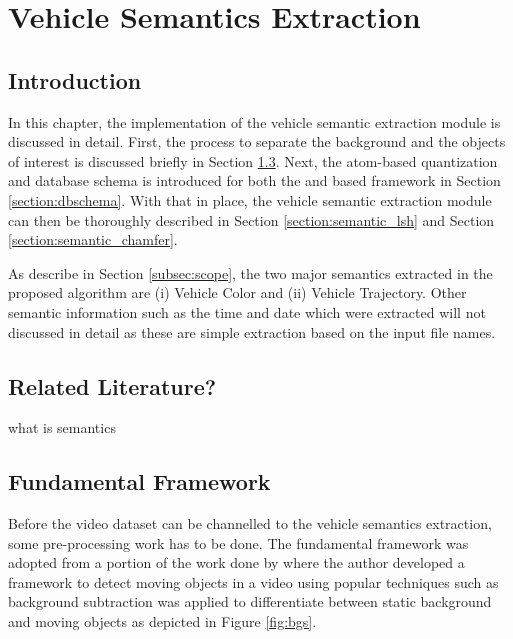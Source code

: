 \chapter{Vehicle Semantics Extraction}

\label{section:semanticsextraction}


\section{Introduction}

In this chapter, the implementation of the vehicle semantic extraction module is discussed in detail. First, the process to separate the background and the objects of interest is discussed briefly in Section \ref{subsection:fundamental}. Next, the atom-based quantization and database schema is introduced for both the \versionOne and \versionTwo based framework in Section \ref{section:dbschema}. With that in place, the vehicle semantic extraction module can then be thoroughly described in Section \ref{section:semantic_lsh} and Section \ref{section:semantic_chamfer}.





As describe in Section \ref{subsec:scope}, the two major semantics extracted in the proposed algorithm are (i) Vehicle Color and (ii) Vehicle Trajectory. Other semantic information such as the time and date which were extracted will not discussed in detail as these are simple extraction based on the input file names.


\section{Related Literature?}

what is semantics


\section{Fundamental Framework}
\label{subsection:fundamental}

Before the video dataset can be channelled to the vehicle semantics extraction, some pre-processing work has to be done. The fundamental framework was adopted from a portion of the work done by \cite{lim2017} where the author developed a framework to detect moving objects in a video using popular techniques such as background subtraction was applied to differentiate between static background and moving objects as depicted in Figure \ref{fig:bgs}. 


